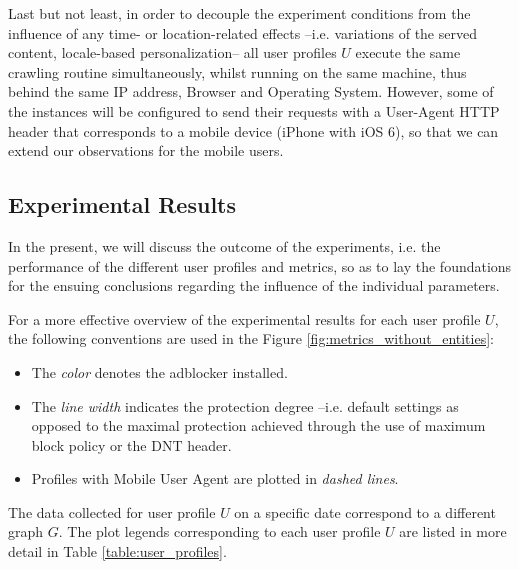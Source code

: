 \documentclass{sig-alternate}
\begin{document}
Last but not least, in order to decouple the experiment conditions from the influence of any time- or location-related effects --i.e. variations of the served content, locale-based personalization-- all user profiles $U$ execute the same crawling routine simultaneously, whilst running on the same machine, thus behind the same IP address, Browser and Operating System. {\color{blue}However, some of the instances will be configured to send their requests with a User-Agent HTTP header that corresponds to a mobile device (iPhone with iOS 6), so that we can extend our observations for the mobile users.}

\subsection{Experimental Results}
In the present, we will discuss the outcome of the experiments, i.e. the performance of the different user profiles and metrics, so as to lay the foundations for the ensuing conclusions regarding the influence of the individual parameters.

For a more effective overview of the experimental results for each user profile $U$, the following conventions are used in the Figure \ref{fig:metrics_without_entities}:
\begin{itemize}
 \item The \textit{color} denotes the adblocker installed.
 \item The \textit{line width} indicates the protection degree --i.e. default settings as opposed to the maximal protection achieved through the use of maximum block policy or the DNT header.
 \item Profiles with Mobile User Agent are plotted in \textit{dashed lines}.
\end{itemize}
The data collected for user profile $U$ on a specific date correspond to a different graph $G$. The plot legends corresponding to each user profile $U$ are listed in more detail in Table \ref{table:user_profiles}.

  \newcommand\solidthinrule[1][.5cm]{\rule[0.5ex]{#1}{.4pt}}
  \newcommand\solidthickrule[1][.5cm]{\rule[0.5ex]{#1}{1.5pt}}
  \newcommand\dashedthinrule{\mbox{%
    \solidthinrule[1mm]\hspace{1mm}\solidthinrule[1mm]\hspace{1mm}\solidthinrule[1mm]}}
  \newcommand\dashedthickrule{\mbox{%
    \solidthickrule[1mm]\hspace{1mm}\solidthickrule[1mm]\hspace{1mm}\solidthickrule[1mm]}}
\end{document}
